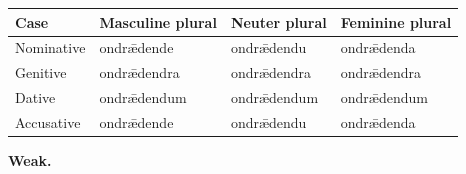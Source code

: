 \fontsize{10.5}{13.2}\selectfont
\setlength{\LTleft}{0pt}\setlength{\LTright}{\fill}
\noindent
\begin{tabular}{@{}>{\raggedright\arraybackslash}p{22.0mm}>{\raggedright\arraybackslash}p{31.188mm}>{\raggedright\arraybackslash}p{31.188mm}>{\raggedright\arraybackslash}p{31.188mm}@{}}
\toprule
\textbf{Case} & \textbf{Masculine plural} & \textbf{Neuter plural} & \textbf{Feminine plural} \\
\midrule
Nominative & ondrǣdende & ondrǣdendu & ondrǣdenda \\
Genitive & ondrǣdendra & ondrǣdendra & ondrǣdendra \\
Dative & ondrǣdendum & ondrǣdendum & ondrǣdendum \\
Accusative & ondrǣdende & ondrǣdendu & ondrǣdenda \\
\bottomrule
\end{tabular}
\par\endgroup

\textbf{Weak.}

